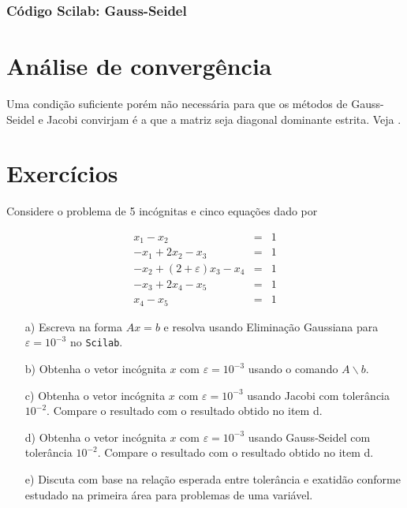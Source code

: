 \ifisscilab
\subsubsection{Código Scilab: Gauss-Seidel}


\fi

\section{Análise de convergência}
Uma condição suficiente porém não necessária para que os métodos de Gauss-Seidel e Jacobi convirjam é a que a matriz seja diagonal dominante estrita. Veja \cite{Burden2013}.

\section*{Exercícios}

\begin{Exercise} Considere o problema de 5 incógnitas e cinco equações dado por

\begin{eqnarray*}
x_1-x_2&=&1\\
-x_{1}+2x_2-x_{3}&=&1\\
-x_{2}+(2+\varepsilon) x_3-x_{4}&=&1\\
-x_{3}+2x_4-x_{5}&=&1\\
x_{4}-x_{5}&=&1
\end{eqnarray*}
\begin{itemize}
\item[a)]  Escreva na forma $Ax=b$ e resolva usando Eliminação Gaussiana para $\varepsilon=10^{-3}$ no \verb+Scilab+.
\item[b)]  Obtenha o vetor incógnita $x$ com $\varepsilon=10^{-3}$ usando o comando $A\backslash b$.
\item[c)]  Obtenha o vetor incógnita $x$ com $\varepsilon=10^{-3}$ usando Jacobi com tolerância $10^{-2}$. Compare o resultado com o resultado obtido no item d.
\item[d)]  Obtenha o vetor incógnita $x$ com $\varepsilon=10^{-3}$ usando Gauss-Seidel com tolerância $10^{-2}$. Compare o resultado com o resultado obtido no item d.
\item[e)]  Discuta com base na relação esperada entre tolerância e exatidão conforme estudado na primeira área para problemas de uma variável.
\end{itemize}

\end{Exercise}

